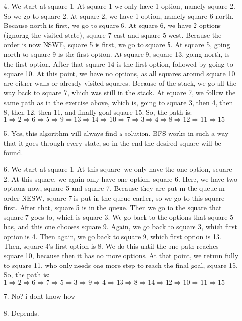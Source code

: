 \documentclass{article}
\begin{document}
\begin{enumerate}
	\item[4.] We start at square 1. At square 1 we only have 1 option, namely square 2. So we go to square 2. At square 2, we have 1 option, namely square 6 north. Because north is first, we go to square 6. At square 6, we have 2 options (ignorng the visited state), square 7 east and square 5 west. Because the order is now NSWE, square 5 is first, we go to square 5. At square 5, going north to square 9 is the first option. At square 9, square 13, going north, is the first option. After that square 14 is the first option, followed by going to square 10. At this point, we have no options, as all squares around square 10 are either walls or already visited squares. Because of the stack, we go all the way back to square 7, which was still in the stack. At square 7, we follow the same path as in the exercise above, which is, going to square 3, then 4, then 8, then 12, then 11, and finally goal square 15. So, the path is:\\
	$1\Rightarrow2\Rightarrow6\Rightarrow5\Rightarrow9\Rightarrow13\Rightarrow14\Rightarrow10\Rightarrow7\Rightarrow3\Rightarrow4\Rightarrow8\Rightarrow12\Rightarrow11\Rightarrow15$
	
	\item[5.]
	Yes, this algorithm will always find a solution. BFS works in such a way that it goes through every state, so in the end the desired square will be found.
	
	\item[6.] 
	We start at square 1. At this square, we only have the one option, square 2. At this square, we again only have one option, square 6. Here, we have two options now, square 5 and square 7. Because they are put in the queue in order NESW, square 7 is put in the queue earlier, so we go to this square first. After that, square 5 is in the queue. Then we go to the square that square 7 goes to, which is square 3. We go back to the options that square 5 has, and this one chooses square 9. Again, we go back to square 3, which first option is 4. Then again, we go back to square 9, which first option is 13. Then, square 4's first option is 8. We do this until the one path reaches square 10, because then it has no more options. At that point, we return fully to square 11, who only needs one more step to reach the final goal, square 15.
	So, the path is:\\
	$1\Rightarrow2\Rightarrow6\Rightarrow7\Rightarrow5\Rightarrow3\Rightarrow9\Rightarrow4\Rightarrow13\Rightarrow8\Rightarrow14\Rightarrow12\Rightarrow10\Rightarrow11\Rightarrow15$
	
	
	\item[7.] No? i dont know how 
	
	\item[8.] Depends. 
	
\end{enumerate}
	
\end{document}
